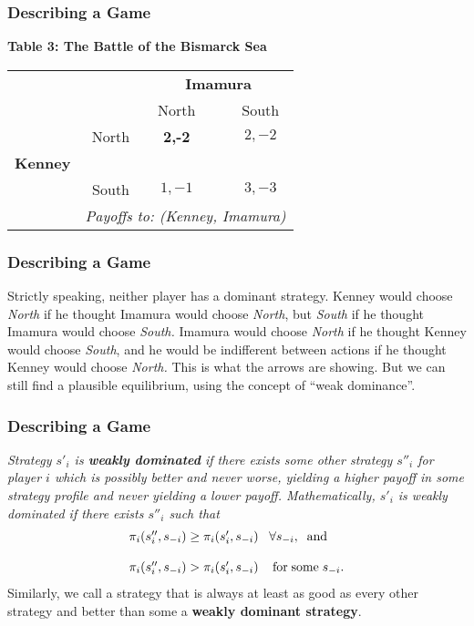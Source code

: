  \begin{frame}[fragile]\frametitle{Describing a Game}
\begin{center} {\bf Table  3:   The Battle of the Bismarck Sea   }

\begin{tabular}{lcccc} &           & \multicolumn{3}{c}{\bf Imamura}\\ &
&    North    &  &  South    \\ &     North     &   {\bf 2,-2} &    & $2,-2$
\\
{\bf   Kenney} &                 &          &      &        \\ &     South     &
$1,-1$ &    &    $3,-3$ \\
  & \multicolumn{4}{l}{\it  Payoffs to: (Kenney, Imamura) } \\
  \end{tabular} \end{center}
\end{frame}


 \begin{frame}[fragile]\frametitle{Describing a Game}
          Strictly speaking, neither player has a dominant strategy. Kenney
would choose {\it North} if he thought Imamura would choose {\it North}, but
{\it South} if he thought Imamura would choose {\it South.} Imamura would choose
{\it North} if he thought Kenney would choose {\it South}, and he would be
indifferent between actions if he thought Kenney would choose {\it North.} This
is what the arrows are showing.    But we can still find a plausible
equilibrium, using the concept of ``weak dominance''.
\end{frame}

 \begin{frame}[fragile]\frametitle{Describing a Game}
 {\it  Strategy   $s'_i$ is  {\bf weakly dominated} if  there exists
some other strategy $s''_i$ for player $i$ which is  possibly better and never
worse,  yielding a higher  payoff  in some strategy profile and never yielding a
lower payoff. Mathematically, $s'_i$ is weakly dominated if there exists $s''_i$
such that}
\begin{equation} \label{e5}
  \begin{array}{l}
 \pi_i(s_i'',s_{-i}) \geq \pi_i(s_i',s_{-i})\;\;\; \forall s_{-i}, \; \; {\rm
and}\; \\
 \\
\pi_i(s_i'',s_{-i}) > \pi_i(s_i',s_{-i})\;\;\;  \;{\rm for \;some} \; s_{-i}.
 \end{array}
 \end{equation}
 Similarly, we call a  strategy  that is always at least as good   as every
other strategy and better than some a {\bf weakly dominant strategy}.
\end{frame}


